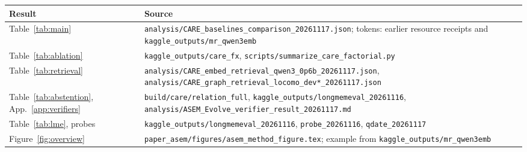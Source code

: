 \documentclass[10pt]{article}
\theoremstyle{plain}
\theoremstyle{definition}
\begin{document}
{\footnotesize
\begin{tabular}{>{\raggedright\arraybackslash}p{4.0cm}>{\raggedright\arraybackslash}p{11.5cm}}
\toprule
Result & Source \\
\midrule
Table~\ref{tab:main} & \texttt{analysis/\allowbreak CARE\_baselines\_comparison\_20261117.json}; tokens: earlier resource receipts and \texttt{kaggle\_outputs/\allowbreak mr\_qwen3emb} \\
Table~\ref{tab:ablation} & \texttt{kaggle\_outputs/\allowbreak care\_fx}, \texttt{scripts/\allowbreak summarize\_care\_factorial.py} \\
Table~\ref{tab:retrieval} & \texttt{analysis/\allowbreak CARE\_embed\_retrieval\_qwen3\_0p6b\_20261117.json}, \texttt{analysis/\allowbreak CARE\_graph\_retrieval\_locomo\_dev*\_20261117.json} \\
Table~\ref{tab:abstention}, App.~\ref{app:verifiers} & \texttt{build/care/relation\_full}, \texttt{kaggle\_outputs/\allowbreak longmemeval\_20261116}, \texttt{analysis/\allowbreak ASEM\_Evolve\_verifier\_result\_20261117.md} \\
Table~\ref{tab:lme}, probes & \texttt{kaggle\_outputs/\allowbreak longmemeval\_20261116}, \texttt{probe\_20261116}, \texttt{qdate\_20261117} \\
Figure~\ref{fig:overview} & \texttt{paper\_asem/figures/\allowbreak asem\_method\_figure.tex}; example from \texttt{kaggle\_outputs/\allowbreak mr\_qwen3emb} \\
\bottomrule
\end{tabular}}
\end{document}
